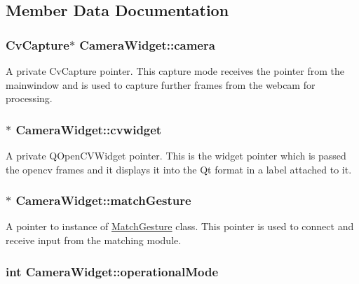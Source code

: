 \subsection{Member Data Documentation}
\hypertarget{classCameraWidget_a3ec280c32b8923e76d49e6dc3ab845cf}{
\subsubsection[{camera}]{\setlength{\rightskip}{0pt plus 5cm}CvCapture$\ast$ {\bf CameraWidget::camera}}}
\label{classCameraWidget_a3ec280c32b8923e76d49e6dc3ab845cf}
A private CvCapture pointer. This capture mode receives the pointer from the mainwindow and is used to capture further frames from the webcam for processing. \hypertarget{classCameraWidget_a26a75c26ed103223c9e127f402108b09}{
\subsubsection[{cvwidget}]{$\ast$ {\bf CameraWidget::cvwidget}}}
\label{classCameraWidget_a26a75c26ed103223c9e127f402108b09}
A private QOpenCVWidget pointer. This is the widget pointer which is passed the opencv frames and it displays it into the Qt format in a label attached to it. \hypertarget{classCameraWidget_a7107e471a359c2577f9dfac50969d635}{
\subsubsection[{matchGesture}]{$\ast$ {\bf CameraWidget::matchGesture}}}
\label{classCameraWidget_a7107e471a359c2577f9dfac50969d635}
A pointer to instance of \hyperlink{classMatchGesture}{MatchGesture} class. This pointer is used to connect and receive input from the matching module. \hypertarget{classCameraWidget_a9816f938d5bf155f91bbaa86f66fd1dd}{
\subsubsection[{operationalMode}]{\setlength{\rightskip}{0pt plus 5cm}int {\bf CameraWidget::operationalMode}}}
